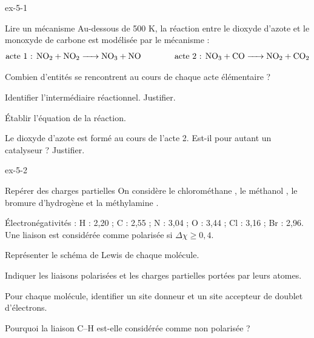 \begin{blocLivre}{ex-5-1}
\begin{exercice}[1]{Lire un mécanisme}
Au-dessous de 500 K, la réaction entre le dioxyde d'azote et le monoxyde de carbone est modélisée par le mécanisme :
\[\text{acte 1 : }\ce{NO2 + NO2 -> NO3 + NO}\qquad\qquad\text{acte 2 : }\ce{NO3 + CO -> NO2 + CO2}\]
\begin{questions}
\item Combien d'entités se rencontrent au cours de chaque acte élémentaire ?
\item Identifier l'intermédiaire réactionnel. Justifier.
\item Établir l'équation de la réaction.
\item Le dioxyde d'azote est formé au cours de l'acte 2. Est-il pour autant un catalyseur ? Justifier.
\end{questions}
\end{exercice}
\end{blocLivre}
\begin{blocLivre}{ex-5-2}
\begin{exercice}[1]{Repérer des charges partielles}
On considère le chlorométhane , le méthanol , le bromure d'hydrogène  et la
méthylamine .
\begin{donnees}
Électronégativités : H : 2,20 ; C : 2,55 ; N : 3,04 ; O : 3,44 ; Cl : 3,16 ; Br : 2,96. Une liaison est considérée
comme polarisée si $\Delta\chi\geq0{,}4$.
\end{donnees}
\begin{questions}
\item Représenter le schéma de Lewis de chaque molécule.
\item Indiquer les liaisons polarisées et les charges partielles portées par leurs atomes.
\item Pour chaque molécule, identifier un site donneur et un site accepteur de doublet d'électrons.
\item Pourquoi la liaison C--H est-elle considérée comme non polarisée ?
\end{questions}
\end{exercice}
\end{blocLivre}
